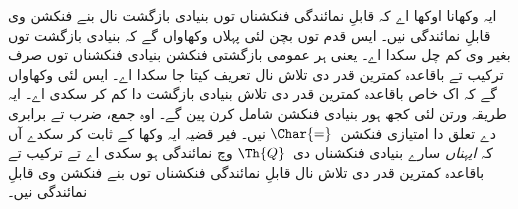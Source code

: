 \documentclass[../../../include/open-logic-section]{subfiles}
\begin{document}
ایہ وکھانا اوکھا اے کہ قابلِ نمائندگی فنکشناں توں بنیادی
بازگشت نال بنے فنکشن وی قابلِ نمائندگی نیں۔ ایس قدم توں
بچن لئی پہلاں وکھاواں گے کہ بنیادی بازگشت توں بغیر وی
کم چل سکدا اے۔ یعنی ہر عمومی بازگشتی فنکشن بنیادی فنکشناں
توں صرف ترکیب تے باقاعدہ کمترین قدر دی تلاش نال تعریف
کیتا جا سکدا اے۔ ایس لئی وکھاواں گے کہ اک خاص باقاعدہ کمترین
قدر دی تلاش بنیادی بازگشت دا کم کر سکدی اے۔ ایہ طریقہ
ورتن لئی کجھ ہور بنیادی فنکشن شامل کرن پین گے۔ اوہ جمع، ضرب
تے برابری دے تعلق دا امتیازی فنکشن~$\Char{=}$ نیں۔ فیر قضیہ
ایہ وکھا کے ثابت کر سکدے آں کہ \emph{ایہناں} سارے بنیادی
فنکشناں دی~$\Th{Q}$ وچ نمائندگی ہو سکدی اے تے ترکیب تے
باقاعدہ کمترین قدر دی تلاش نال قابلِ نمائندگی فنکشناں توں
بنے فنکشن وی قابلِ نمائندگی نیں۔
\end{document}
